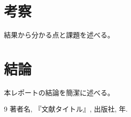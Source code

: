 \documentclass[uplatex,a4paper,12pt]{jsarticle}
\begin{document}
\section{考察}
結果から分かる点と課題を述べる。

\section{結論}
本レポートの結論を簡潔に述べる。

\begin{thebibliography}{9}
著者名, 『文献タイトル』, 出版社, 年.
\end{thebibliography}
\end{document}

